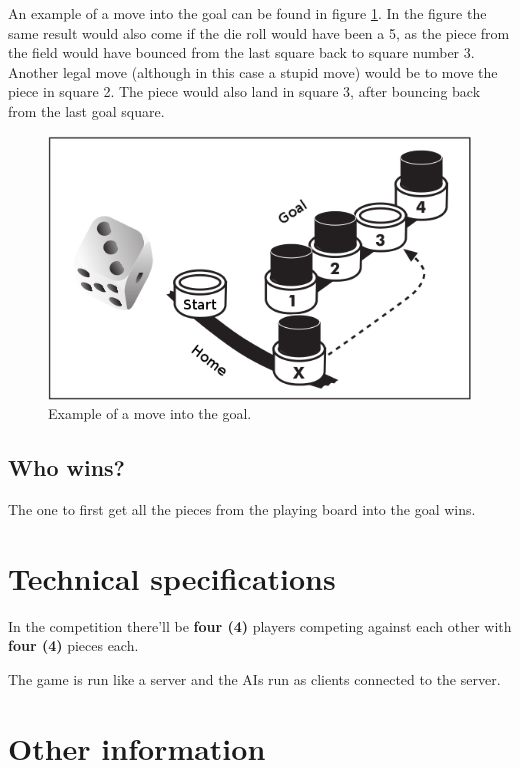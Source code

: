 \documentclass[10pt,a4paper]{article}
\begin{document}
An example of a move into the goal can be found in figure \ref{fig:move-goal}. In the figure the same result would also come if the die roll would have been a 5, as the piece from the field would have bounced from the last square back to square number 3. Another legal move (although in this case a stupid move) would be to move the piece in square 2. The piece would also land in square 3, after bouncing back from the last goal square.

\begin{figure}[H]
\begin{center}
\includegraphics[width=.4\linewidth]{move-3.png}
\end{center}
\caption{Example of a move into the goal.}
\label{fig:move-goal}
\end{figure}

\subsection{Who wins?}

The one to first get all the pieces from the playing board into the goal wins.



\section{Technical specifications}
\label{sec:tech-specs}


In the competition there'll be \textbf{four (4)} players competing against each other with \textbf{four (4)} pieces each.

The game is run like a server and the AIs run as clients connected to the server.



\section{Other information}
\label{sec:other-info}

\end{document}
